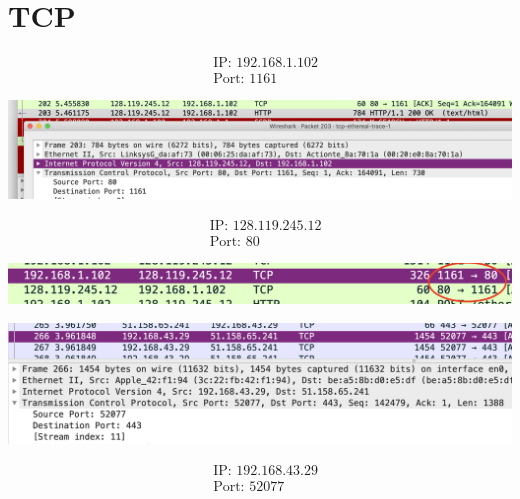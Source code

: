  

\section{TCP}
\problem{}
\begin{figure}	
\end{figure}

\begin{align*}
	&\text{IP: } 192.168.1.102 \\
	&\text{Port: } 1161
\end{align*}

{
\centering
\includegraphics[scale = 0.4]{s1}
}

\problem{}

\begin{align*}
	&\text{IP: } 128.119.245.12 \\
	&\text{Port: } 80
\end{align*}

{
\centering
\includegraphics[scale = 0.6]{s2}
}

\problem{}

{
\centering
\includegraphics[scale = 0.50]{s3}
}

\begin{align*}
	&\text{IP: } 192.168.43.29 \\
	&\text{Port: } 52077
\end{align*}

\problem{}

